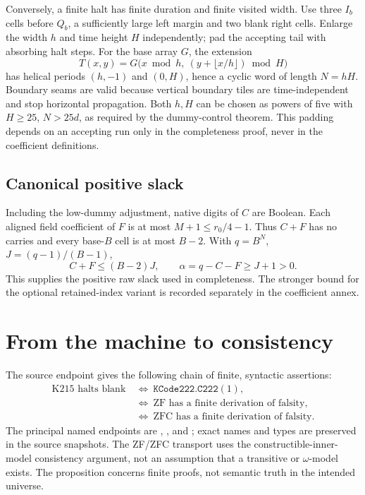 \documentclass[11pt]{article}
\begin{document}
Conversely, a finite halt has finite duration and finite visited width. Use three \(I_b\) cells before \(Q_b\), a sufficiently large left margin and two blank right cells. Enlarge the width \(h\) and time height \(H\) independently; pad the accepting tail with absorbing halt steps. For the base array \(G\), the extension
\[
 T(x,y)=G\bigl(x\bmod h,\ (y+\lfloor x/h\rfloor)\bmod H\bigr)
\]
has helical periods \((h,-1)\) and \((0,H)\), hence a cyclic word of length \(N=hH\). Boundary seams are valid because vertical boundary tiles are time-independent and stop horizontal propagation. Both \(h,H\) can be chosen as powers of five with \(H\ge25\), \(N>25d\), as required by the dummy-control theorem. This padding depends on an accepting run only in the completeness proof, never in the coefficient definitions.

\subsection{Canonical positive slack}
Including the low-dummy adjustment, native digits of \(C\) are Boolean. Each aligned field coefficient of \(F\) is at most \(M+1\le r_0/4-1\). Thus \(C+F\) has no carries and every base-\(B\) cell is at most \(B-2\). With \(q=B^N\), \(J=(q-1)/(B-1)\),
\[
 C+F\le(B-2)J,\qquad \alpha=q-C-F\ge J+1>0.
\]
This supplies the positive raw slack used in completeness. The stronger bound for the optional retained-index variant is recorded separately in the coefficient annex.

\section{From the machine to consistency}

The source endpoint gives the following chain of finite, syntactic assertions:
\begin{align*}
 \text{K215 halts blank}
 &\ \Longleftrightarrow\ \texttt{KCode222.C222}(1),\\
 &\ \Longleftrightarrow\ \text{ZF has a finite derivation of falsity},\\
 &\ \Longleftrightarrow\ \text{ZFC has a finite derivation of falsity}.
\end{align*}
The principal named endpoints are , , and ; exact names and types are preserved in the source snapshots. The ZF/ZFC transport uses the constructible-inner-model consistency argument, not an assumption that a transitive or \(\omega\)-model exists. The proposition concerns finite proofs, not semantic truth in the intended universe.
\end{document}
